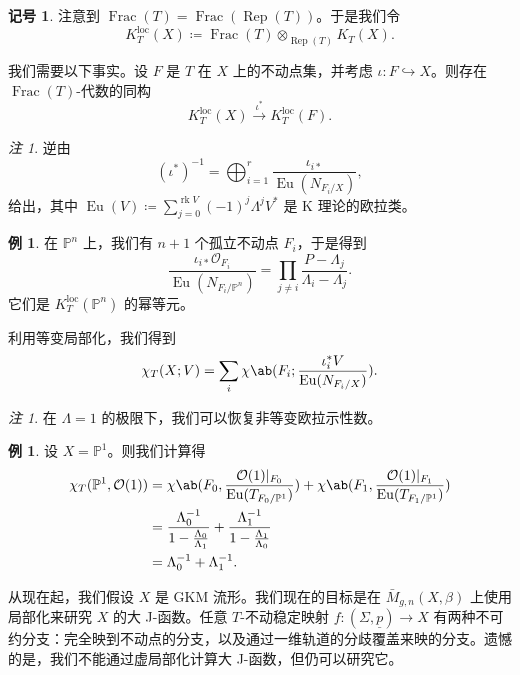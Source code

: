 \documentclass{amsart}
\theoremstyle{definition}
\newtheorem{exm}[thm]{例}
\newtheorem{notn}[thm]{记号}
\theoremstyle{remark}
\newtheorem{rmk}[thm]{注}
\theoremstyle{plain}
\theoremstyle{definition}
\theoremstyle{remark}
\renewcommand{\P}{\mathbb{P}}
\newcommand{\mc}[1]{\mathcal{#1}}
\newcommand{\mr}[1]{\mathrm{#1}}
\newcommand{\on}[1]{\operatorname{#1}}
\newcommand{\ul}[1]{\underline{#1}}
\newcommand{\1}{\mathbf{1}}
\newcommand{\2}{\mathbf{2}}
\newcommand{\3}{\mathbf{3}}
\newcommand{\loc}{\mr{loc}}
\begin{document}
\begin{notn}
    注意到 \(\on{Frac}(T) = \on{Frac}(\on{Rep}(T))\)。于是我们令
    \[ K_T^{\loc}(X) \coloneqq \on{Frac}(T) \otimes_{\on{Rep}(T)} K_T(X). \]
\end{notn}

我们需要以下事实。设 \(F\) 是 \(T\) 在 \(X\) 上的不动点集，并考虑 \(\iota \colon F \hookrightarrow X\)。则存在 \(\on{Frac}(T)\)-代数的同构
\[ K_T^{\loc}(X) \xrightarrow{\iota^*} K_T^{\loc}(F). \]

\begin{rmk}
    逆由
    \[ (\iota^*)^{-1} = \bigoplus_{i=1}^r \frac{\iota_{i*}}{\on{Eu}(N_{F_i/X})}, \]
    给出，其中 \(\on{Eu}(V) \coloneqq \sum_{j = 0}^{\on{rk} V} (-1)^j \Lambda^j V^*\) 是 K 理论的欧拉类。
\end{rmk}

\begin{exm}
    在 \(\P^n\) 上，我们有 \(n+1\) 个孤立不动点 \(F_i\)，于是得到
    \[ \frac{\iota_{i*} \mc{O}_{F_i}}{\on{Eu}(N_{F_i/\P^n})} = \prod_{j \neq i} \frac{P - \Lambda_j}{\Lambda_i - \Lambda_j}. \]
    它们是 \(K_T^{\loc}(\P^n)\) 的幂等元。
\end{exm}

利用等变局部化，我们得到
\[ \chi_T(X; V) = \sum_i \chi\ab(F_i; \frac{\iota_i^* V}{\on{Eu}(N_{F_i/X})}). \]

\begin{rmk}
    在 \(\Lambda = 1\) 的极限下，我们可以恢复非等变欧拉示性数。
\end{rmk}

\begin{exm}
    设 \(X = \P^1\)。则我们计算得
    \begin{align*}
        \chi_T(\P^1, \mc{O}(1)) &= \chi\ab(F_0, \frac{\mc{O}(1)|_{F_0}}{\on{Eu}(T_{F_0/\P^1})}) + \chi\ab(F_1, \frac{\mc{O}(1)|_{F_1}}{\on{Eu}(T_{F_1/\P^1})}) \\
        &= \frac{\Lambda_0^{-1}}{1 - \frac{\Lambda_0}{\Lambda_1}} + \frac{\Lambda_1^{-1}}{1 - \frac{\Lambda_1}{\Lambda_0}} \\
        &= \Lambda_0^{-1} + \Lambda_1^{-1}. 
    \end{align*}
\end{exm}

从现在起，我们假设 \(X\) 是 GKM 流形。我们现在的目标是在 \(\bar{M}_{g,n}(X, \beta)\) 上使用局部化来研究 \(X\) 的大 J-函数。任意 \(T\)-不动稳定映射 \(f \colon (\Sigma, \ul{p}) \to X\) 有两种不可约分支：完全映到不动点的分支，以及通过一维轨道的分歧覆盖来映的分支。遗憾的是，我们不能通过虚局部化计算大 J-函数，但仍可以研究它。
\end{document}
